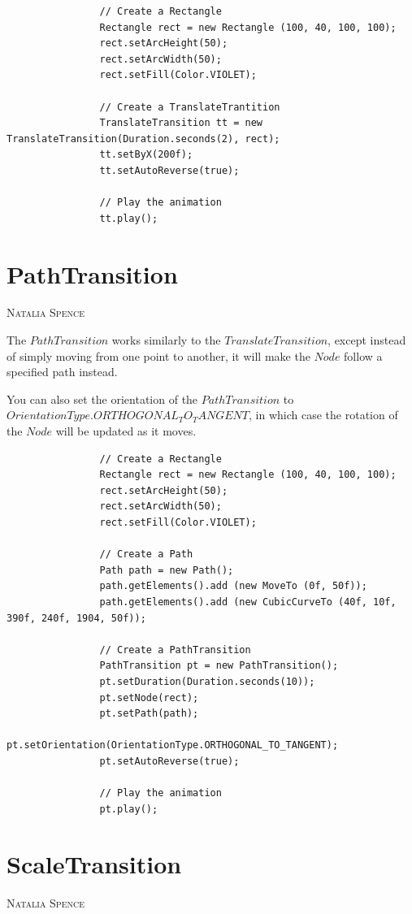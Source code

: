 \documentclass[a4paper]{report}
\makeatletter
\newcommand{\sectionauthor}[1]{%
	{\parindent0pt\vspace*{0pt}%
		\linespread{1.1}\large\scshape#1%
		\par\nobreak\vspace*{10pt}}
	\@afterheading%
}
\makeatother
\begin{document}
			\begin{lstlisting}
				// Create a Rectangle
				Rectangle rect = new Rectangle (100, 40, 100, 100);
				rect.setArcHeight(50);
				rect.setArcWidth(50);
				rect.setFill(Color.VIOLET);
				
				// Create a TranslateTrantition
				TranslateTransition tt = new TranslateTransition(Duration.seconds(2), rect);
				tt.setByX(200f);
				tt.setAutoReverse(true);
				
				// Play the animation
				tt.play();
			\end{lstlisting}
			
			\pagebreak
			
		\section{PathTransition}\label{sec:path transition}
		\sectionauthor{Natalia Spence}
		
			The $PathTransition$ works similarly to the $TranslateTransition$, except instead of simply moving from one point to another, it will make the $Node$ follow a specified path instead.
			
			You can also set the orientation of the $PathTransition$ to $OrientationType.ORTHOGONAL_TO_TANGENT$, in which case the rotation of the $Node$ will be updated as it moves.
			
			\begin{lstlisting}
				// Create a Rectangle
				Rectangle rect = new Rectangle (100, 40, 100, 100);
				rect.setArcHeight(50);
				rect.setArcWidth(50);
				rect.setFill(Color.VIOLET);
				
				// Create a Path
				Path path = new Path();
				path.getElements().add (new MoveTo (0f, 50f));
				path.getElements().add (new CubicCurveTo (40f, 10f, 390f, 240f, 1904, 50f));
				
				// Create a PathTransition
				PathTransition pt = new PathTransition();
				pt.setDuration(Duration.seconds(10));
				pt.setNode(rect);
				pt.setPath(path);
				pt.setOrientation(OrientationType.ORTHOGONAL_TO_TANGENT);
				pt.setAutoReverse(true);
				
				// Play the animation
				pt.play();
			\end{lstlisting}
		
		\section{ScaleTransition}\label{sec:scale transition}
		\sectionauthor{Natalia Spence}
		
\end{document}
